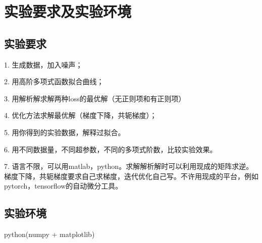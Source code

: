 \section{实验要求及实验环境}

\subsection{实验要求}

1. 生成数据，加入噪声；

2. 用高阶多项式函数拟合曲线；

3. 用解析解求解两种loss的最优解（无正则项和有正则项）

4. 优化方法求解最优解（梯度下降，共轭梯度）；

5. 用你得到的实验数据，解释过拟合。

6. 用不同数据量，不同超参数，不同的多项式阶数，比较实验效果。

7. 语言不限，可以用matlab，python。求解解析解时可以利用现成的矩阵求逆。梯度下降，共轭梯度要求自己求梯度，迭代优化自己写。不许用现成的平台，例如pytorch，tensorflow的自动微分工具。

\subsection{实验环境}

python(numpy + matplotlib)
